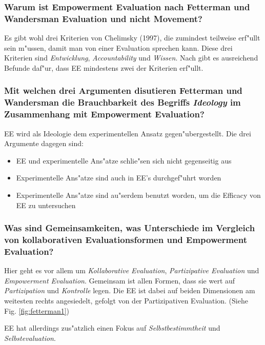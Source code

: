 \subsubsection{Warum ist Empowerment Evaluation nach Fetterman und Wandersman Evaluation und nicht Movement?}
Es gibt wohl drei Kriterien von Chelimsky (1997), die zumindest teilweise erf"ullt sein m"ussen, damit man von einer Evaluation sprechen kann. Diese drei Kriterien sind \emph{Entwicklung}, \emph{Accountability} und \emph{Wissen}. Nach \textcite{fetterman_empowerment_2007} gibt es ausreichend Befunde daf"ur, dass EE mindestens zwei der Kriterien erf"ullt.

\subsubsection{Mit welchen drei Argumenten disutieren Fetterman und Wandersman die Brauchbarkeit des Begriffs \emph{Ideology} im Zusammenhang mit Empowerment Evaluation?}
EE wird als Ideologie dem experimentellen Ansatz gegen"ubergestellt. Die drei Argumente dagegen sind:
\begin{itemize}
        \item EE und experimentelle Ans"atze schlie"sen sich nicht gegenseitig aus
        \item Experimentelle Ans"atze sind auch in EE's durchgef"uhrt worden
        \item Experimentelle Ans"atze sind au"serdem benutzt worden, um die Efficacy von EE zu untersuchen
\end{itemize}

\subsubsection{Was sind Gemeinsamkeiten, was Unterschiede im Vergleich von kollaborativen Evaluationsformen und Empowerment Evaluation?}
Hier geht es vor allem um \emph{Kollaborative Evaluation}, \emph{Partizipative Evaluation} und \emph{Empowerment Evaluation}. Gemeinsam ist allen Formen, dass sie wert auf \emph{Partizipation} und \emph{Kontrolle} legen. Die EE ist dabei auf beiden Dimensionen am weitesten rechts angesiedelt, gefolgt von der Partizipativen Evaluation. (Siehe Fig. \ref{fig:fetterman1})

EE hat allerdings zus"atzlich einen Fokus auf \emph{Selbstbestimmtheit} und \emph{Selbstevaluation}.

